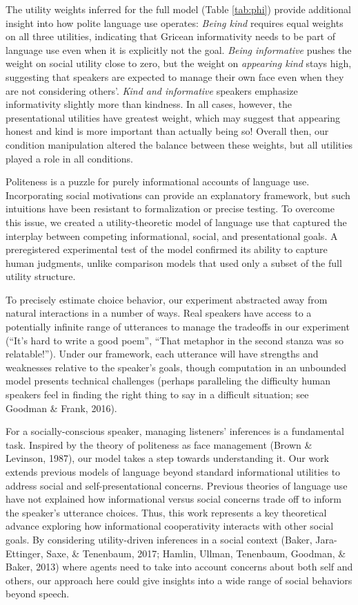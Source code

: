 \documentclass[floatsintext,man]{apa6}
\theoremstyle{definition}
\theoremstyle{definition}
\theoremstyle{definition}
\theoremstyle{remark}
\begin{document}
The utility weights inferred for the full model (Table \ref{tab:phi})
provide additional insight into how polite language use operates:
\emph{Being kind} requires equal weights on all three utilities,
indicating that Gricean informativity needs to be part of language use
even when it is explicitly not the goal. \emph{Being informative} pushes
the weight on social utility close to zero, but the weight on
\emph{appearing kind} stays high, suggesting that speakers are expected
to manage their own face even when they are not considering others'.
\emph{Kind and informative} speakers emphasize informativity slightly
more than kindness. In all cases, however, the presentational utilities
have greatest weight, which may suggest that appearing honest and kind
is more important than actually being so! Overall then, our condition
manipulation altered the balance between these weights, but all
utilities played a role in all conditions.

Politeness is a puzzle for purely informational accounts of language
use. Incorporating social motivations can provide an explanatory
framework, but such intuitions have been resistant to formalization or
precise testing. To overcome this issue, we created a utility-theoretic
model of language use that captured the interplay between competing
informational, social, and presentational goals. A preregistered
experimental test of the model confirmed its ability to capture human
judgments, unlike comparison models that used only a subset of the full
utility structure.

To precisely estimate choice behavior, our experiment abstracted away
from natural interactions in a number of ways. Real speakers have access
to a potentially infinite range of utterances to manage the tradeoffs in
our experiment (\enquote{It's hard to write a good poem}, \enquote{That
metaphor in the second stanza was so relatable!}). Under our framework,
each utterance will have strengths and weaknesses relative to the
speaker's goals, though computation in an unbounded model presents
technical challenges (perhaps paralleling the difficulty human speakers
feel in finding the right thing to say in a difficult situation; see
Goodman \& Frank, 2016).

For a socially-conscious speaker, managing listeners' inferences is a
fundamental task. Inspired by the theory of politeness as face
management (Brown \& Levinson, 1987), our model takes a step towards
understanding it. Our work extends previous models of language beyond
standard informational utilities to address social and
self-presentational concerns. Previous theories of language use have not
explained how informational versus social concerns trade off to inform
the speaker's utterance choices. Thus, this work represents a key
theoretical advance exploring how informational cooperativity interacts
with other social goals. By considering utility-driven inferences in a
social context (Baker, Jara-Ettinger, Saxe, \& Tenenbaum, 2017; Hamlin,
Ullman, Tenenbaum, Goodman, \& Baker, 2013) where agents need to take
into account concerns about both self and others, our approach here
could give insights into a wide range of social behaviors beyond speech.
\end{document}
